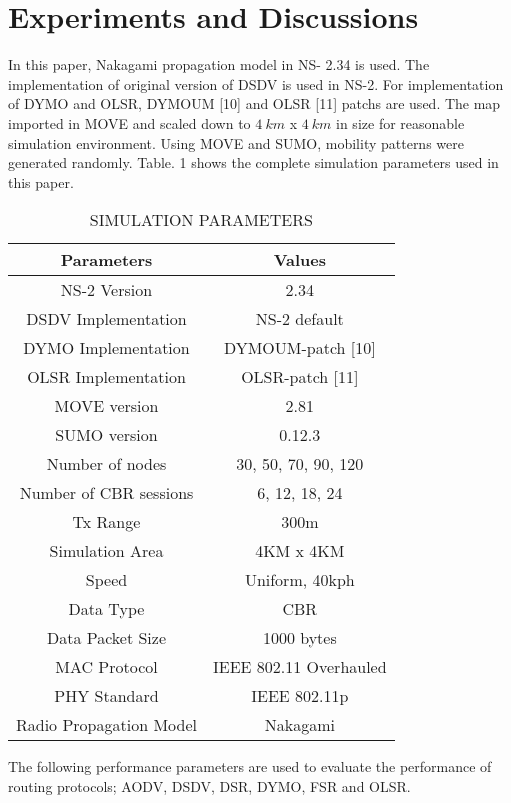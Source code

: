 \documentclass[journal]{IEEEtran}
\begin{document}
\section{Experiments and Discussions }
In this paper, Nakagami propagation model in NS- 2.34 is used. The implementation of original version of DSDV is used in NS-2. For implementation of DYMO and OLSR, DYMOUM [10] and OLSR [11] patchs  are used. The map imported in MOVE and scaled down to $4~km$ x $4~km$ in size for reasonable simulation environment. Using MOVE and SUMO, mobility patterns were generated randomly. Table. 1 shows the complete simulation parameters used in this paper.
\begin{table}[h]
\caption{SIMULATION PARAMETERS}
\begin{center}
 \begin{tabular}{| c | c |}
  \hline
  \textbf{Parameters} & \textbf{Values} \\ \hline
    NS-2 Version &  2.34 \\ \hline
    DSDV Implementation &	NS-2 default \\ \hline
    DYMO Implementation	&   DYMOUM-patch [10] \\ \hline
    OLSR Implementation  &	OLSR-patch [11] \\ \hline
    MOVE version  &	  2.81 \\ \hline
    SUMO version  &	  0.12.3 \\ \hline
    Number of nodes & 30, 50, 70, 90, 120 \\ \hline
    Number of CBR sessions & 6, 12, 18, 24 \\ \hline
    Tx Range &	300m \\ \hline
    Simulation Area &	4KM x 4KM \\ \hline
    Speed &	Uniform, 40kph \\ \hline
    Data Type &	CBR \\ \hline
    Data Packet Size &	1000 bytes \\ \hline
    MAC Protocol &	IEEE 802.11 Overhauled \\ \hline
    PHY Standard &	IEEE 802.11p \\ \hline
    Radio Propagation Model &	Nakagami \\ \hline

 \end{tabular}
\end{center}
\end{table}
The following performance parameters are used to evaluate the performance of routing protocols; AODV, DSDV, DSR, DYMO, FSR and OLSR.
\end{document}
